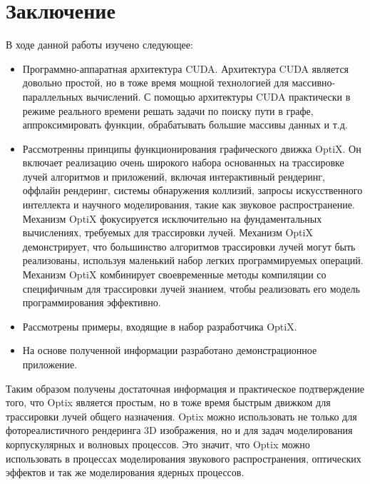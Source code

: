 \section*{\centering Заключение}

В ходе данной работы изучено следующее:
\begin{itemize}
\item Программно-аппаратная архитектура CUDA. Архитектура CUDA является довольно простой, но в тоже время мощной технологией для массивно-параллельных вычислений. С помощью архитектуры CUDA практически в режиме реального времени решать задачи по поиску пути в графе, аппроксимировать функции, обрабатывать большие массивы данных и т.д.

 \item Рассмотренны принципы функционирования графического движка OptiX. Он включает реализацию очень широкого набора основанных на трассировке лучей алгоритмов и приложений, включая интерактивный рендеринг, оффлайн рендеринг, системы обнаружения коллизий, запросы искусственного интеллекта и научного моделирования, такие как звуковое распространение.
 Механизм OptiX фокусируется исключительно на фундаментальных вычислениях, требуемых для трассировки лучей.
 Механизм OptiX демонстрирует, что большинство алгоритмов трассировки лучей могут быть реализованы, используя маленький набор легких программируемых операций. Механизм OptiX комбинирует своевременные методы компиляции со специфичным для трассировки лучей знанием, чтобы реализовать его модель программирования эффективно. 
 \item Рассмотрены примеры, входящие в набор разработчика OptiX.
 
 \item На основе полученной информации разработано демонстрационное приложение. 
\end{itemize}
Таким образом  получены достаточная информация и практическое подтверждение того, что Optix является простым, но в тоже время быстрым движком для трассировки лучей общего назначения. Optix можно использовать не только для фотореалистичного рендеринга 3D изображения, но и для задач моделирования корпускулярных и волновых процессов. Это значит, что Optix можно использовать в процессах моделирования звукового распространения, оптических эффектов и так же моделирования ядерных процессов. 